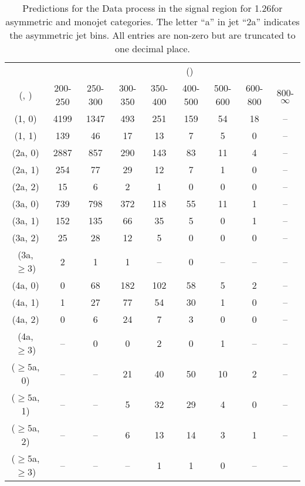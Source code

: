 \begin{table}[h!]
\tiny
\centering
\caption{Predictions for the Data process in the signal region for 1.26\ifb for asymmetric and monojet categories. The letter ``a'' in jet \eg ``2a''  indicates the asymmetric jet bins. All entries are non-zero but are truncated to one decimal place.\label{tab:predsep_data_sig_asym}}
\begin{tabular}
{ccccccccc}
	\hline\hline
&	& \multicolumn{8}{c}{\scalht (\gev)} \\ 
	 (\njet,  \nb) & 200-250 & 250-300 & 300-350 & 350-400 & 400-500 & 500-600 & 600-800 & 800-$\infty$ \\ [0.8ex] 
\hline
	(1, 0) & 4199 & 1347 & 493 & 251 & 159 & 54 & 18 & -- \\[0.5ex] 
	(1, 1) & 139 & 46 & 17 & 13 & 7 & 5 & 0 & -- \\[0.5ex] 
	(2a, 0) & 2887 & 857 & 290 & 143 & 83 & 11 & 4 & -- \\[0.5ex] 
	(2a, 1) & 254 & 77 & 29 & 12 & 7 & 1 & 0 & -- \\[0.5ex] 
	(2a, 2) & 15 & 6 & 2 & 1 & 0 & 0 & 0 & -- \\[0.5ex] 
	(3a, 0) & 739 & 798 & 372 & 118 & 55 & 11 & 1 & -- \\[0.5ex] 
	(3a, 1) & 152 & 135 & 66 & 35 & 5 & 0 & 1 & -- \\[0.5ex] 
	(3a, 2) & 25 & 28 & 12 & 5 & 0 & 0 & 0 & -- \\[0.5ex] 
	(3a, $\ge3$) & 2 & 1 & 1 & -- & 0 & -- & -- & -- \\[0.5ex] 
	(4a, 0) & 0 & 68 & 182 & 102 & 58 & 5 & 2 & -- \\[0.5ex] 
	(4a, 1) & 1 & 27 & 77 & 54 & 30 & 1 & 0 & -- \\[0.5ex] 
	(4a, 2) & 0 & 6 & 24 & 7 & 3 & 0 & 0 & -- \\[0.5ex] 
	(4a, $\ge3$) & -- & 0 & 0 & 2 & 0 & 1 & -- & -- \\[0.5ex] 
	($\ge5$a, 0) & -- & -- & 21 & 40 & 50 & 10 & 2 & -- \\[0.5ex] 
	($\ge5$a, 1) & -- & -- & 5 & 32 & 29 & 4 & 0 & -- \\[0.5ex] 
	($\ge5$a, 2) & -- & -- & 6 & 13 & 14 & 3 & 1 & -- \\[0.5ex] 
	($\ge5$a, $\ge3$) & -- & -- & -- & 1 & 1 & 0 & -- & -- \\[0.5ex] 
	\hline
	\hline
\end{tabular}
\end{table}
